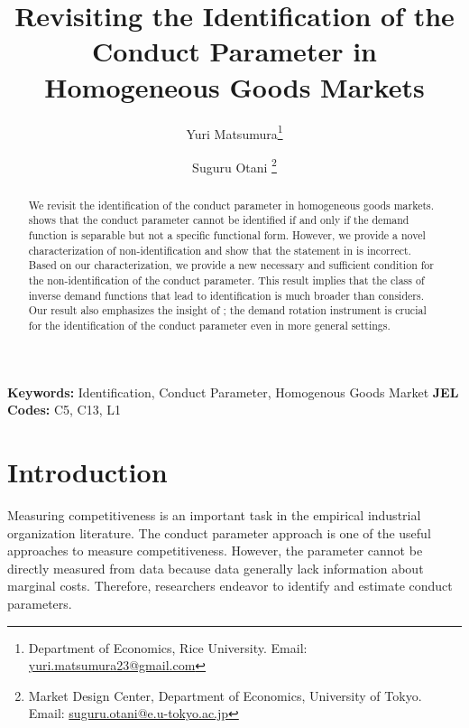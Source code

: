 \documentclass[11pt, a4paper]{article}
\title{Revisiting the Identification of the Conduct Parameter in Homogeneous Goods Markets}
\author{Yuri Matsumura\thanks{Department of Economics, Rice University. Email: \href{mailto:yuri.matsumura23@gmail.com}{yuri.matsumura23@gmail.com}} \and Suguru Otani \thanks{Market Design Center, Department of Economics, University of Tokyo. Email: \href{mailto:suguru.otani@e.u-tokyo.ac.jp}{suguru.otani@e.u-tokyo.ac.jp}
}}
\theoremstyle{remark}
\begin{document}
\maketitle
\begin{abstract}
    We revisit the identification of the conduct parameter in homogeneous goods markets.
    \citet{lau1982identifying} shows that the conduct parameter cannot be identified if and only if the demand function is separable but not a specific functional form.
    However, we provide a novel characterization of non-identification and show that the statement in \citet{lau1982identifying} is incorrect.
    Based on our characterization, we provide a new necessary and sufficient condition for the non-identification of the conduct parameter.
    This result implies that the class of inverse demand functions that lead to identification is much broader than \citet{lau1982identifying} considers.
    Our result also emphasizes the insight of \citet{bresnahan1982oligopoly}; the demand rotation instrument is crucial for the identification of the conduct parameter even in more general settings.
\end{abstract}

\noindent\textbf{Keywords:} Identification, Conduct Parameter, Homogenous Goods Market
\vspace{0in}
\newline
\noindent\textbf{JEL Codes:} C5, C13, L1

\bigskip




\newpage
\section{Introduction}
Measuring competitiveness is an important task in the empirical industrial organization literature.
The conduct parameter approach is one of the useful approaches to measure competitiveness.
However, the parameter cannot be directly measured from data because data generally lack information about marginal costs.
Therefore, researchers endeavor to identify and estimate conduct parameters.
\end{document}
